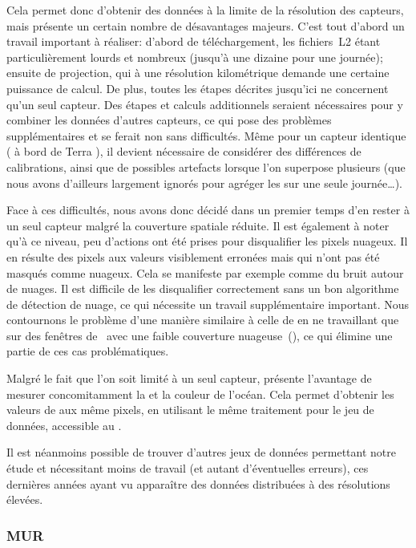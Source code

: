 Cela permet donc d'obtenir des données à la limite de la résolution des capteurs, mais présente un certain nombre de désavantages majeurs.
C'est tout d'abord un travail important à réaliser: d'abord de téléchargement, les fichiers~L2 étant particulièrement lourds et nombreux (jusqu'à une dizaine pour une journée); ensuite de projection, qui à une résolution kilométrique demande une certaine puissance de calcul.
De plus, toutes les étapes décrites jusqu'ici ne concernent qu'un seul capteur.
Des étapes et calculs additionnels seraient nécessaires pour y combiner les données d'autres capteurs, ce qui pose des problèmes supplémentaires et se ferait non sans difficultés.
Même pour un capteur identique ( à bord de Terra ), il devient nécessaire de considérer des différences de calibrations, ainsi que de possibles artefacts lorsque l'on superpose plusieurs  (que nous avons d'ailleurs largement ignorés pour agréger les  sur une seule journée\dots).

Face à ces difficultés, nous avons donc décidé dans un premier temps d'en rester à un seul capteur malgré la couverture spatiale réduite.
Il est également à noter qu'à ce niveau, peu d'actions ont été prises pour disqualifier les pixels nuageux.
Il en résulte des pixels aux valeurs visiblement erronées mais qui n'ont pas été masqués comme nuageux.
Cela se manifeste par exemple comme du bruit autour de nuages.
Il est difficile de les disqualifier correctement sans un bon algorithme de détection de nuage, ce qui nécessite un travail supplémentaire important.
Nous contournons le problème d'une manière similaire à celle de \textcite{liu_2016} en ne travaillant que sur des fenêtres de~ avec une faible couverture nuageuse~(), ce qui élimine une partie de ces cas problématiques.

Malgré le fait que l'on soit limité à un seul capteur,  présente l'avantage de mesurer concomitamment la  et la couleur de l'océan.
Cela permet d'obtenir les valeurs de  aux même pixels, en utilisant le même traitement pour le jeu de données, accessible au .

Il est néanmoins possible de trouver d'autres jeux de données permettant notre étude et nécessitant moins de travail (et autant d'éventuelles erreurs), ces dernières années ayant vu apparaître des données distribuées à des résolutions élevées.

\subsubsection{MUR}


